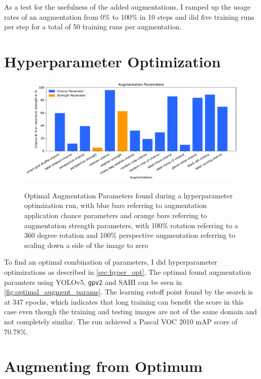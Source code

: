 \documentclass[10pt]{book}
\begin{document}
As a test for the usefulness of the added augmentations, I ramped up the usage rates of an augmentation from 0\% to 100\% in 10 steps and did five training runs per step for a total of 50 training runs per augmentation.





\section{Hyperparameter Optimization}

\begin{figure}
  \caption{Optimal Augmentation Parameters found during a hyperparameter optimization run, with blue bars referring to augmentation application chance parameters and orange bars referring to augmentation strength parameters, with 100\% rotation referring to a 360 degree rotation and 100\% perspective augmentation referring to scaling down a side of the image to zero}
  \includegraphics[width=\textwidth]{plot/best_hyp_run_params}
  \label{fig:optimal_augment_params}
\end{figure}

To find an optimal combination of parameters, I did hyperparameter optimizations as described in \autoref{sec:hyper_opt}. The optimal found augmentation paramters using \ac{YOLO}v5, \texttt{gpv2} and \ac{SAHI} can be seen in \autoref{fig:optimal_augment_params}. The learning cutoff point found by the search is at 347 epochs, which indicates that long training can benefit the score in this case even though the training and testing images are not of the same domain and not completely similar. The run achieved a Pascal VOC 2010 \ac{mAP} score of 70.78\%.


\section{Augmenting from Optimum}
\end{document}

